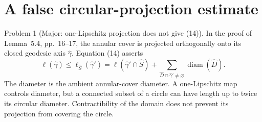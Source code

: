 \documentclass[10pt]{article}
\begin{document}
\section*{A false circular-projection estimate}
Problem 1 (Major: one-Lipschitz projection does not give (14)).  In the proof of Lemma 5.4, pp. 16–17, the annular cover is projected orthogonally onto its closed geodesic axis \(\widehat\gamma\). Equation (14) asserts \[\ell(\widehat\gamma)\le
 \ell_{\widehat S}(\widehat\gamma')
 =
 \ell(\widehat\gamma'\cap\widehat S)
 +\sum_{\widehat D\cap\widehat\gamma'\ne\varnothing}
      \operatorname{diam}(\widehat D).\] The diameter is the ambient annular-cover diameter. A one-Lipschitz map controls diameter, but a connected subset of a circle can have length up to twice its circular diameter. Contractibility of the domain does not prevent its projection from covering the circle.\par
\end{document}
